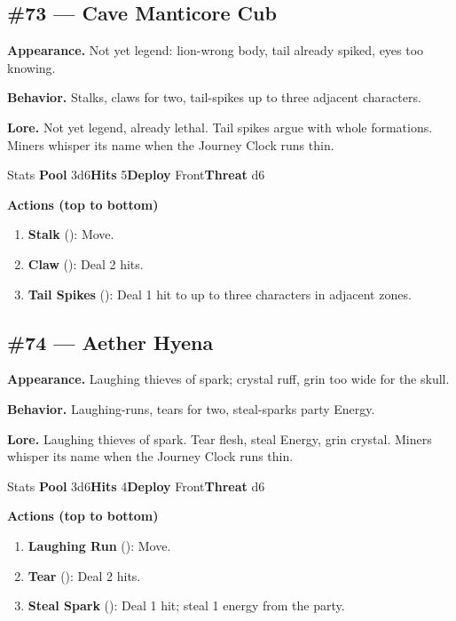 \subsection*{\#73 --- Cave Manticore Cub}

\textbf{Appearance.} Not yet legend: lion-wrong body, tail already spiked, eyes too knowing.

\textbf{Behavior.} Stalks, claws for two, tail-spikes up to three adjacent characters.

\textbf{Lore.} Not yet legend, already lethal. Tail spikes argue with whole formations. Miners whisper its name when the Journey Clock runs thin.

\begin{monsterentry}{Stats}
\textbf{Pool} 3d6\quad\textbf{Hits} 5\quad\textbf{Deploy} Front\quad\textbf{Threat} d6

\textbf{Actions (top to bottom)}
\begin{enumerate}\setlength{\itemsep}{0.15em}\setlength{\parskip}{0pt}
  \item \textbf{Stalk} (\easy): Move.
  \item \textbf{Claw} (\medium): Deal 2 hits.
  \item \textbf{Tail Spikes} (\hard): Deal 1 hit to up to three characters in adjacent zones.
\end{enumerate}
\end{monsterentry}

\subsection*{\#74 --- Aether Hyena}

\textbf{Appearance.} Laughing thieves of spark; crystal ruff, grin too wide for the skull.

\textbf{Behavior.} Laughing-runs, tears for two, steal-sparks party Energy.

\textbf{Lore.} Laughing thieves of spark. Tear flesh, steal Energy, grin crystal. Miners whisper its name when the Journey Clock runs thin.

\begin{monsterentry}{Stats}
\textbf{Pool} 3d6\quad\textbf{Hits} 4\quad\textbf{Deploy} Front\quad\textbf{Threat} d6

\textbf{Actions (top to bottom)}
\begin{enumerate}\setlength{\itemsep}{0.15em}\setlength{\parskip}{0pt}
  \item \textbf{Laughing Run} (\easy): Move.
  \item \textbf{Tear} (\medium): Deal 2 hits.
  \item \textbf{Steal Spark} (\hard): Deal 1 hit; steal 1 energy from the party.
\end{enumerate}
\end{monsterentry}

